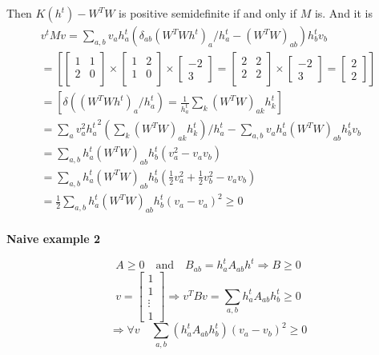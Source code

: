 \documentclass[oneside, final, 14pt]{extarticle}
\begin{document}
Then $K(h^t) - W^TW$ is positive semidefinite if and only if $M$ is.
And it is
\begin{multline}
  v^t M v =
  \sum_{a,b}v_a h_a^t (\delta_{ab}(W^TWh^t)_a / h_a^t
  -(W^TW)_{ab})h_b^t v_b \\
  =
  \left[
    \begin{bmatrix}1 & 1 \\ 2 & 0 \\ \end{bmatrix} \times
    \begin{bmatrix}1 & 2 \\ 1 & 0 \\ \end{bmatrix} \times
    \begin{bmatrix} -2 \\ 3 \end{bmatrix}
    =
      \begin{bmatrix}2 & 2 \\ 2 & 2 \\ \end{bmatrix} \times
      \begin{bmatrix} -2 \\ 3 \end{bmatrix} =
      \begin{bmatrix} 2 \\ 2 \end{bmatrix}
  \right] \\
  =
  \left[
    \delta((W^TWh^t)_a / h_a^t) =
    \frac{1}{h_a^t} \sum_k (W^TW)_{ak} h_k^t
  \right] \\
  =
  \sum_a v_a^2 {h_a^t}^2
    \left(\sum_k(W^TW)_{ak}h_k^t\right) /h_a^t -
    \sum_{a,b} v_ah_a^t(W^TW)_{ab}h_b^tv_b \\
  = \sum_{a,b}h_a^t(W^TW)_{ab}h_b^t(v_a^2 - v_av_b) \\
  = \sum_{a,b}h_a^t(W^TW)_{ab}h_b^t(
    \frac{1}{2}v_a^2 + \frac{1}{2}v_b^2 - v_av_b) \\
  = \frac{1}{2} \sum_{a,b}h_a^t(W^TW)_{ab}h_b^t(v_a - v_a)^2 \geqslant 0 \\
\end{multline}

\textbf{Naive example 2}

\[
  A \geqslant 0 \quad \text{and} \quad
  B_{ab} = h_a^tA_{ab}h^t
  \Rightarrow B \geqslant 0
\]
\[
  v =
  \begin{bmatrix}
    1 \\ 1 \\ \vdots \\ 1
  \end{bmatrix} \Rightarrow
  v^TBv = \sum_{a,b} h_a^tA_{ab}h_b^t \geqslant 0
\]
\[
  \Rightarrow \forall v \quad
  \sum_{a,b}\left(h_a^tA_{ab}h_b^t\right) (v_a - v_b)^2 \geqslant 0
\]
\end{document}
